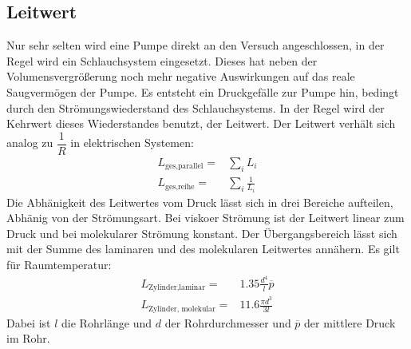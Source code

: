 \subsection{Leitwert}
Nur sehr selten wird eine Pumpe direkt an den Versuch angeschlossen, in der Regel wird ein Schlauchsystem eingesetzt. Dieses hat neben der Volumensvergrößerung
noch mehr negative Auswirkungen auf das reale Saugvermögen der Pumpe. Es entsteht ein Druckgefälle zur Pumpe hin, bedingt durch den Strömungswiederstand des Schlauchsystems. In der Regel wird der Kehrwert dieses Wiederstandes benutzt, der Leitwert. Der Leitwert verhält sich analog zu $\dfrac{1}{R}$ in elektrischen
Systemen:
\begin{align}
	L_\text{ges,parallel}=&\sum_i L_i \\
	L_\text{ges,reihe}=&\sum_i \frac{1}{L_i}
\end{align}
Die Abhänigkeit des Leitwertes vom Druck lässt sich in drei Bereiche aufteilen, Abhänig von der Strömungsart. Bei viskoer Strömung ist der Leitwert linear zum
Druck und bei molekularer Strömung konstant. Der Übergangsbereich lässt sich mit der Summe des laminaren und des molekularen Leitwertes annähern.
Es gilt für Raumtemperatur:
\begin{align}
	L_\text{Zylinder,laminar}=& \num{1.35}\frac{d^4}{l}\overline{p} \\
	L_\text{Zylinder, molekular}=& \num{11.6}\frac{\pi d^3}{3l}
\end{align}
Dabei ist $l$ die Rohrlänge und $d$ der Rohrdurchmesser und $\overline{p}$ der mittlere Druck im Rohr.
